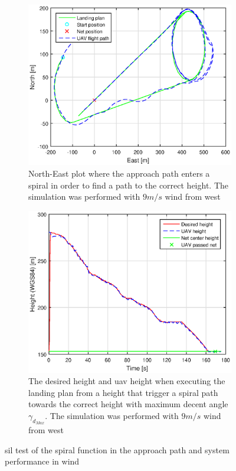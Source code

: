\begin{figure}[H]
\centering
\begin{subfigure}{0.7\textwidth}
		\includegraphics[width=\textwidth]{figs/SysPlot/SILNorthEast6juni092307.eps}
\caption{North-East plot where the approach path enters a spiral in order to find a path to the correct height. The simulation was performed with $9 m/s$ wind from west}
\label{Fig:SILNorthEastSpiral092307}
\end{subfigure}
\begin{subfigure}{0.7\textwidth}
		\includegraphics[width=\textwidth]{figs/SysPlot/SILHeightSpiral6juni092307.eps}
\caption{The desired height and \gls{uav} height when executing the landing plan from a height that trigger a spiral path towards the correct height with maximum decent angle $\gamma_{d_{Max}}$. The simulation was performed with $9 m/s$ wind from west}
\label{Fig:SILHeightSpiral092307}
\end{subfigure}
\caption{\gls{sil} test of the spiral function in the approach path and system performance in wind}
\label{Fig:SILSpiral}
\end{figure}

